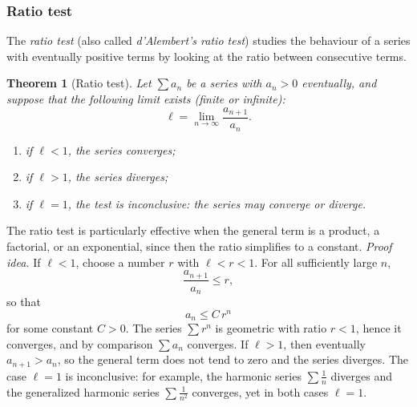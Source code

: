 \documentclass[11pt,a4paper]{article}
\theoremstyle{definition} \newtheorem{definition}{Definition} \theoremstyle{plain} \newtheorem{theorem}{Theorem}
\begin{document}
\subsubsection{Ratio test}\label{sec:ratio-test}
The \emph{ratio test} (also called \emph{d'Alembert's ratio test}) studies the behaviour of a series with eventually positive terms by looking at the ratio between consecutive terms.
\begin{theorem}[Ratio test]\label{thm:ratio-test-series} Let $\sum a_n$ be a series with $a_n>0$ eventually, and suppose that the following limit exists (finite or infinite):
\[ \ell = \lim_{n\to\infty} \frac{a_{n+1}}{a_n}. \]
\begin{enumerate} \item if $\ell<1$, the series \emph{converges}; \item if $\ell>1$, the series \emph{diverges}; \item if $\ell=1$, the test is \emph{inconclusive}: the series may converge or diverge. \end{enumerate} \end{theorem}
The ratio test is particularly effective when the general term is a product, a factorial, or an exponential, since then the ratio simplifies to a constant.
\emph{Proof idea.}
If $\ell<1$, choose a number $r$ with $\ell<r<1$.
For all sufficiently large $n$,
\[ \frac{a_{n+1}}{a_n} \le r, \]
so that
\[ a_n \le C\, r^n \]
for some constant $C>0$.
The series $\sum r^n$ is geometric with ratio $r<1$, hence it converges, and by comparison $\sum a_n$ converges.
If $\ell>1$, then eventually $a_{n+1}>a_n$, so the general term does not tend to zero and the series diverges.
The case $\ell=1$ is inconclusive: for example, the harmonic series $\sum \frac1n$ diverges and the generalized harmonic series $\sum \frac1{n^2}$ converges, yet in both cases $\ell=1$.
\end{document}
